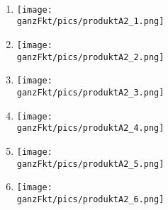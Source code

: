 \begin{Exercise}[title={Stelle die Funktionsgleichung auf. Verwende jeweils die kleinstmögliche Vielfachheit.}, label=ganzProduktA2]\\
	\begin{minipage}{\textwidth}
		\begin{minipage}{0.5\textwidth}
			\begin{enumerate}[label=\alph*)]
				\item \begin{minipage}[t]{0.8\textwidth}\vspace{-0.5\baselineskip}
					\texttt{[image: \\ganzFkt/pics/produktA2\_1.png]}%
				\end{minipage}%

                \bigskip

				\item \begin{minipage}[t]{0.8\textwidth}\vspace{-0.5\baselineskip}
					\texttt{[image: \\ganzFkt/pics/produktA2\_2.png]}%
				\end{minipage}%

                \bigskip

				\item \begin{minipage}[t]{0.8\textwidth}\vspace{-0.5\baselineskip}
					\texttt{[image: \\ganzFkt/pics/produktA2\_3.png]}%
				\end{minipage}%
			\end{enumerate}%
		\end{minipage}%
		\begin{minipage}{0.5\textwidth}
			\begin{enumerate}[label=\alph*)]
				\setcounter{enumi}{3}
				\item \begin{minipage}[t]{0.8\textwidth}\vspace{-0.5\baselineskip}
					\texttt{[image: \\ganzFkt/pics/produktA2\_4.png]}%
				\end{minipage}%

                \bigskip

				\item \begin{minipage}[t]{0.8\textwidth}\vspace{-0.5\baselineskip}
					\texttt{[image: \\ganzFkt/pics/produktA2\_5.png]}%
				\end{minipage}%

                \bigskip

				\item \begin{minipage}[t]{0.8\textwidth}\vspace{-0.5\baselineskip}
					\texttt{[image: \\ganzFkt/pics/produktA2\_6.png]}%
				\end{minipage}%
			\end{enumerate}%
		\end{minipage}%
	\end{minipage}%
\end{Exercise}\newpage
